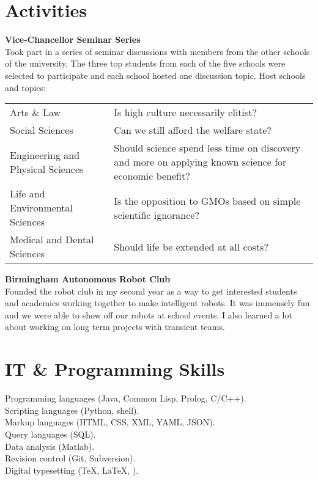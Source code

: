 \documentclass[10pt, a4paper]{article}
\newcommand{\years}[1]{\marginnote{\scriptsize #1}}
\begin{document}
\section*{Activities}
\years{2011--2012}\textbf{Vice-Chancellor Seminar Series}\\[.2cm]
Took part in a series of seminar discussions with members from the
other schools of the university. The three top students from each of
the five schools were selected to participate and each school hosted
one discussion topic. Host schools and topics:\\[.1cm]
\small{
  \begin{tabular}{l p{8cm}}
    \hspace{.5cm}Arts \& Law & Is high culture necessarily elitist?\\
    \hspace{.5cm}Social Sciences & Can we still afford the welfare state?\\
    \hspace{.5cm}Engineering and Physical Sciences & Should science spend less time on discovery and more on applying known science for economic benefit?\\
    \hspace{.5cm}Life and Environmental Sciences & Is the opposition to GMOs based on simple scientific ignorance?\\
    \hspace{.5cm}Medical and Dental Sciences & Should life be extended at all costs?
  \end{tabular}
}
\vspace{.3cm}

\years{2010--2012}\textbf{Birmingham Autonomous Robot Club}\\[.2cm]
Founded the robot club in my second year as a way to get interested
students and academics working together to make intelligent robots. It
was immensely fun and we were able to show off our robots at school
events. I also learned a lot about working on long term projects with
transient teams.

\section*{IT \& Programming Skills}
Programming languages (Java, Common Lisp, Prolog, C/C++).\\
Scripting languages (Python, shell).\\
Markup languages (HTML, CSS, XML, YAML, JSON).\\
Query languages (SQL).\\
Data analysis (Matlab).\\
Revision control (Git, Subversion).\\
Digital typesetting (\TeX, \LaTeX, \XeTeX).
\end{document}
